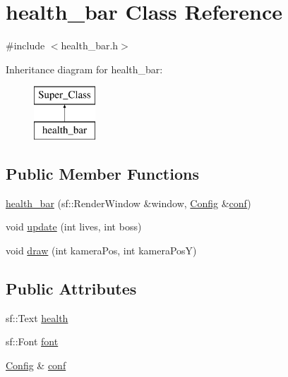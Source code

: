 \hypertarget{classhealth__bar}{}\section{health\+\_\+bar Class Reference}
\label{classhealth__bar}


{\ttfamily \#include $<$health\+\_\+bar.\+h$>$}

Inheritance diagram for health\+\_\+bar\+:\begin{figure}[H]
\begin{center}
\leavevmode
\includegraphics[height=2.000000cm]{classhealth__bar}
\end{center}
\end{figure}
\subsection*{Public Member Functions}
\begin{DoxyCompactItemize}
\item 
\hyperlink{classhealth__bar_aab2af089c751952555ee45a802d9c297}{health\+\_\+bar} (sf\+::\+Render\+Window \&window, \hyperlink{class_config}{Config} \&\hyperlink{classhealth__bar_a9990a1716583ab2bc92dfe2b86beab1d}{conf})
\item 
void \hyperlink{classhealth__bar_a1cb1380b8336ec05076b1a09376bb73b}{update} (int lives, int boss)
\item 
void \hyperlink{classhealth__bar_a06b20deda0e6c34cc947e8c1aa63c4c8}{draw} (int kamera\+Pos, int kamera\+PosY)
\end{DoxyCompactItemize}
\subsection*{Public Attributes}
\begin{DoxyCompactItemize}
\item 
sf\+::\+Text \hyperlink{classhealth__bar_a9ce78c10bf9cf0c2fc9b20e97ff28287}{health}
\item 
sf\+::\+Font \hyperlink{classhealth__bar_a5f5edaaf53bde6f9283e0a3fa059e4f4}{font}
\item 
\hyperlink{class_config}{Config} \& \hyperlink{classhealth__bar_a9990a1716583ab2bc92dfe2b86beab1d}{conf}
\end{DoxyCompactItemize}
